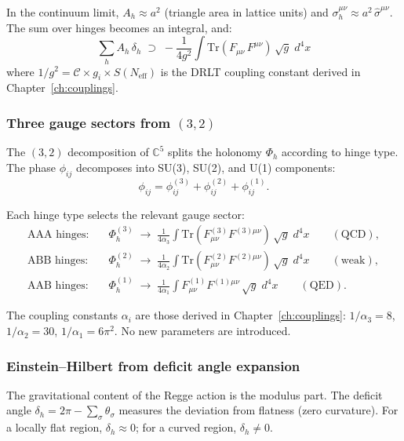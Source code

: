 In the continuum limit, $A_h \approx a^2$ (triangle area in lattice units) and $\sigma^{\mu\nu}_h \approx a^2\,\hat{\sigma}^{\mu\nu}$.  The sum over hinges becomes an integral, and:
\begin{equation}
\boxed{\sum_h A_h\,\delta_h \;\supset\; -\frac{1}{4g^2}\int \text{Tr}(F_{\mu\nu}\,F^{\mu\nu})\,\sqrt{g}\;d^4x}
\end{equation}
where $1/g^2 = \mathcal{C} \times g_i \times S(N_\text{eff})$ is the DRLT coupling constant derived in Chapter~\ref{ch:couplings}.

\subsubsection{Three gauge sectors from $(3,2)$}

The $(3,2)$ decomposition of $\mathbb{C}^5$ splits the holonomy $\Phi_h$ according to hinge type.  The phase $\phi_{ij}$ decomposes into SU(3), SU(2), and U(1) components:
\begin{equation}
\phi_{ij} = \phi^{(3)}_{ij} + \phi^{(2)}_{ij} + \phi^{(1)}_{ij}.
\end{equation}

Each hinge type selects the relevant gauge sector:
\begin{align}
\text{AAA hinges:} &\quad \Phi^{(3)}_h \;\to\; \frac{1}{4\alpha_3}\int\text{Tr}(F^{(3)}_{\mu\nu}F^{(3)\mu\nu})\,\sqrt{g}\;d^4x \qquad (\text{QCD}), \\
\text{ABB hinges:} &\quad \Phi^{(2)}_h \;\to\; \frac{1}{4\alpha_2}\int\text{Tr}(F^{(2)}_{\mu\nu}F^{(2)\mu\nu})\,\sqrt{g}\;d^4x \qquad (\text{weak}), \\
\text{AAB hinges:} &\quad \Phi^{(1)}_h \;\to\; \frac{1}{4\alpha_1}\int F^{(1)}_{\mu\nu}F^{(1)\mu\nu}\,\sqrt{g}\;d^4x \qquad (\text{QED}).
\end{align}

The coupling constants $\alpha_i$ are those derived in Chapter~\ref{ch:couplings}: $1/\alpha_3 = 8$, $1/\alpha_2 = 30$, $1/\alpha_1 = 6\pi^2$.  No new parameters are introduced.

\subsubsection{Einstein--Hilbert from deficit angle expansion}

The gravitational content of the Regge action is the modulus part.  The deficit angle $\delta_h = 2\pi - \sum_\sigma \theta_\sigma$ measures the deviation from flatness (zero curvature).  For a locally flat region, $\delta_h \approx 0$; for a curved region, $\delta_h \ne 0$.

